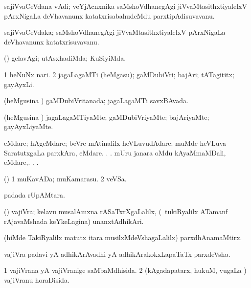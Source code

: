 \bentry 
{} 
\gl{\nA}
\expl{}
\bmng
 sajiVvaCeVdana vAdi; veYjAcnxnika saMshoVdhanegAgi jiVvaMtasithxtiyalelxV pArxNigaLa deVhavanunx katatxrisabahudeMdu parxtipAdisuvavanu. 
\emng
\eentry

\bentry
{} 
\gl{\nA}
\expl{}
\bmng
 sajiVvaCeVdaka; saMshoVdhanegAgi jiVvaMtasithxtiyalelxV pArxNigaLa deVhavanunx katatxrisuvavanu. 
\emng
\eentry

\bentry 
{} 
\gl{\kirxvi}
\expl{}
\bmng
 (\saM) gelavAgi; utAsxhadiMda; KuSiyiMda. 
\emng
\eentry

\bentry
{} 
\gl{\nA}
\expl{}
\bmng
\bnum
\num{1} heNuNx nari. 
\num{2} jagaLagaMTi (heMgasu); gaMDubiVri; bajAri; tATagititx; gayAyxLi. 
\enum
\emng
\eentry

\bentry
{} 
\gl{\gu}
\expl{}
\bmng
 (heMgusina \vi) gaMDubiVritanada; jagaLagaMTi savxBAvada. 
\emng
\eentry

\bentry 
{} 
\gl{\kirxvi}
\expl{}
\bmng
 (heMgusina \vi) jagaLagaMTiyaMte; gaMDubiVriyaMte; bajAriyaMte; gayAyxLiyaMte. 
\emng
\eentry

\bentry 
{} 
\gl{\kirxvi}
\expl{}
\bmng
 eMdare; hAgeMdare; beVre mAtinalilx heVLuvudAdare:  muMde heVLuva SaratutxgaLa parxkAra, eMdare. . .  mUru janara oMdu kAyaMmaMDali, eMdare,. . . 
\emng
\eentry

\bentry 
{} 
\gl{\nA}
\expl{}
\bmng
 (\pArxparx) 
\bnum
\num{1} muKavADa; muKamarasu. 
\num{2} veVSa. 
\enum
\emng
\eentry

\bentry
{} 
\gl{\nA}
\expl{}
\bmng
  padada rUpAMtara. 
\emng
\eentry

\bentry 
{} 
\gl{\nA}
\expl{}
\bmng
 (\ca) vajiVra; kelavu musalAmxna rASaTxrXgaLalilx, (\kanmu\ tukiRyalilx ATamanf rAjavaMshada keYkeLagina) unanxtAdhikAri. 
\emng

\noindent 
\gl{\pagu}
\expl{}
\bmng
  (hiMde TakiRyalilx matutx itara musilxMdeVshagaLalilx) parxdhAnamaMtirx. 
\emng
\eentry

\bentry 
{} 
\gl{\nA}
\expl{}
\bmng
 vajiVra padavi yA adhikArAvadhi yA adhikArakokxLapaTaTx parxdeVsha. 
\emng
\eentry

\bentry
{} 
\gl{\gu}
\expl{}
\bmng
\bnum
\num{1} vajiVrana yA vajiVranige saMbaMdhisida. 
\num{2} (kAgadapatarx, hukuM, \mo vugaLa \vi) vajiVranu horaDisida. 
\enum
\emng
\eentry


